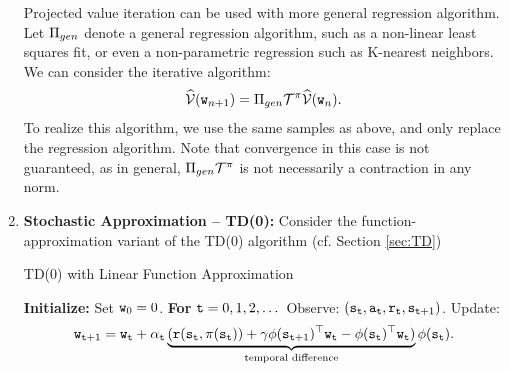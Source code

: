 \begin{enumerate}

\begin{remark}
Projected value iteration can be used with more general regression algorithm. Let $\Pi_{gen}$ denote a general regression algorithm, such as a non-linear least squares fit, or even a non-parametric regression such as K-nearest neighbors. We can consider the iterative algorithm:
$$\widehat{\mathcal{V}}({\tt w}_{n+1}) = \Pi_{gen} \mathcal{T}^\pi \widehat{\mathcal{V}}({\tt w}_{n}).$$
To realize this algorithm, we use the same samples as above, and only replace the regression algorithm. Note that convergence in this case is not guaranteed, as in general, $\Pi_{gen} \mathcal{T}^\pi$ is not necessarily a contraction in any norm.
\end{remark}

\item \textbf{Stochastic Approximation -- TD(0):} Consider the function-approximation variant of the TD(0) algorithm (cf. Section \ref{sec:TD})

\begin{algorithm}[H]
\caption{TD(0) with Linear Function Approximation}
\begin{algorithmic}[1]
\State \textbf{Initialize:} Set ${\tt w}_0 = 0$.
\State \textbf{For} {${\tt t} = 0, 1, 2, \dots$}
    \State \quad Observe: $({\tt s}_{\tt t}, {\tt a}_{\tt t}, {\tt r}_{\tt t}, {\tt s}_{{\tt t}+1})$.
    \State \quad Update:
    \begin{equation}\label{eq:TD_func_approx}
    {\tt w}_{{\tt t}+1} = {\tt w}_{\tt t} + \alpha_{\tt t} \underbrace{( {\tt r}({\tt s}_{\tt t},\pi({\tt s}_{\tt t})) +\gamma {\phi}({\tt s}_{{\tt t}+1})^\top {\tt w}_{\tt t} - {\phi}({\tt s}_{{\tt t}})^\top {\tt w}_{\tt t})}_{\textrm{temporal difference}} \phi({\tt s}_{{\tt t}}).
\end{equation}
\end{algorithmic}
\end{algorithm}


\end{enumerate}

